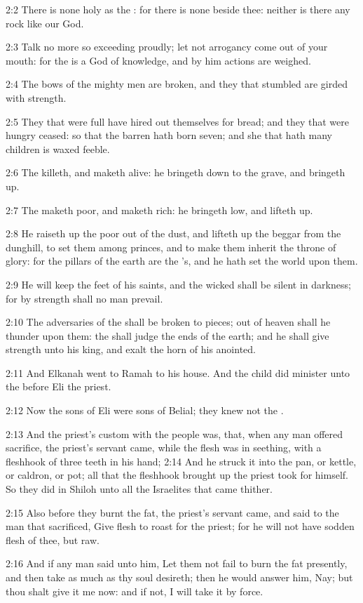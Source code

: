 2:2 There is none holy as the \LORD: for there is none beside thee:
neither is there any rock like our God.

2:3 Talk no more so exceeding proudly; let not arrogancy come out of
your mouth: for the \LORD is a God of knowledge, and by him actions are
weighed.

2:4 The bows of the mighty men are broken, and they that stumbled are
girded with strength.

2:5 They that were full have hired out themselves for bread; and they
that were hungry ceased: so that the barren hath born seven; and she
that hath many children is waxed feeble.

2:6 The \LORD killeth, and maketh alive: he bringeth down to the grave,
and bringeth up.

2:7 The \LORD maketh poor, and maketh rich: he bringeth low, and
lifteth up.

2:8 He raiseth up the poor out of the dust, and lifteth up the beggar
from the dunghill, to set them among princes, and to make them inherit
the throne of glory: for the pillars of the earth are the \LORD's, and
he hath set the world upon them.

2:9 He will keep the feet of his saints, and the wicked shall be
silent in darkness; for by strength shall no man prevail.

2:10 The adversaries of the \LORD shall be broken to pieces; out of
heaven shall he thunder upon them: the \LORD shall judge the ends of
the earth; and he shall give strength unto his king, and exalt the
horn of his anointed.

2:11 And Elkanah went to Ramah to his house. And the child did
minister unto the \LORD before Eli the priest.

2:12 Now the sons of Eli were sons of Belial; they knew not the \LORD.

2:13 And the priest's custom with the people was, that, when any man
offered sacrifice, the priest's servant came, while the flesh was in
seething, with a fleshhook of three teeth in his hand; 2:14 And he
struck it into the pan, or kettle, or caldron, or pot; all that the
fleshhook brought up the priest took for himself. So they did in
Shiloh unto all the Israelites that came thither.

2:15 Also before they burnt the fat, the priest's servant came, and
said to the man that sacrificed, Give flesh to roast for the priest;
for he will not have sodden flesh of thee, but raw.

2:16 And if any man said unto him, Let them not fail to burn the fat
presently, and then take as much as thy soul desireth; then he would
answer him, Nay; but thou shalt give it me now: and if not, I will
take it by force.

